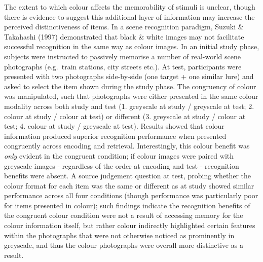 \documentclass[
  11pt,
]{article}
\begin{document}
The extent to which colour affects the memorability of stimuli is
unclear, though there is evidence to suggest this additional layer of
information may increase the perceived distinctiveness of items. In a
scene recognition paradigm, Suzuki \& Takahashi (1997) demonstrated that
black \& white images may not facilitate successful recognition in the
same way as colour images. In an initial study phase, subjects were
instructed to passively memorise a number of real-world scene
photographs (e.g.~train stations, city streets etc.). At test,
participants were presented with two photographs side-by-side (one
target + one similar lure) and asked to select the item shown during the
study phase. The congruency of colour was manipulated, such that
photographs were either presented in the same colour modality across
both study and test (1. greyscale at study / greyscale at test; 2.
colour at study / colour at test) or different (3. greyscale at study /
colour at test; 4. colour at study / greyscale at test). Results showed
that colour information produced superior recognition performance when
presented congruently across encoding and retrieval. Interestingly, this
colour benefit was \emph{only} evident in the congruent condition; if
colour images were paired with greyscale images - regardless of the
order at encoding and test - recognition benefits were absent. A source
judgement question at test, probing whether the colour format for each
item was the same or different as at study showed similar performance
across all four conditions (though performance was particularly poor for
items presented in colour); such findings indicate the recognition
benefits of the congruent colour condition were not a result of
accessing memory for the colour information itself, but rather colour
indirectly highlighted certain features within the photographs that were
not otherwise noticed as prominently in greyscale, and thus the colour
photographs were overall more distinctive as a result.
\end{document}
